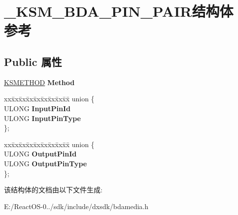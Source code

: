 \hypertarget{struct___k_s_m___b_d_a___p_i_n___p_a_i_r}{}\section{\+\_\+\+K\+S\+M\+\_\+\+B\+D\+A\+\_\+\+P\+I\+N\+\_\+\+P\+A\+I\+R结构体 参考}
\label{struct___k_s_m___b_d_a___p_i_n___p_a_i_r}
\subsection*{Public 属性}
\begin{DoxyCompactItemize}
\item 
\mbox{\label{struct___k_s_m___b_d_a___p_i_n___p_a_i_r_a92696db17c0b34ba66ea63669d103e3c}} 
\hyperlink{struct_k_s_i_d_e_n_t_i_f_i_e_r}{K\+S\+M\+E\+T\+H\+OD} {\bfseries Method}
\item 
\mbox{\label{struct___k_s_m___b_d_a___p_i_n___p_a_i_r_a0114d0ecfffa5ea200d18db8d1afc306}} 
\begin{tabbing}
xx\=xx\=xx\=xx\=xx\=xx\=xx\=xx\=xx\=\kill
union \{\\
\>ULONG {\bfseries InputPinId}\\
\>ULONG {\bfseries InputPinType}\\
\}; \\

\end{tabbing}\item 
\mbox{\label{struct___k_s_m___b_d_a___p_i_n___p_a_i_r_a69cf6b8b4db0a553d2bc5ae719a9f400}} 
\begin{tabbing}
xx\=xx\=xx\=xx\=xx\=xx\=xx\=xx\=xx\=\kill
union \{\\
\>ULONG {\bfseries OutputPinId}\\
\>ULONG {\bfseries OutputPinType}\\
\}; \\

\end{tabbing}\end{DoxyCompactItemize}


该结构体的文档由以下文件生成\+:\begin{DoxyCompactItemize}
\item 
E\+:/\+React\+O\+S-\/0../sdk/include/dxsdk/bdamedia.\+h\end{DoxyCompactItemize}
